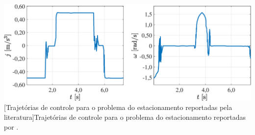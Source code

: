 \noindent	
\begin{minipage}{\textwidth}
	\vspace{\onelineskip}
	\centering
	\includegraphics[scale=0.42]{fig/resultados/estacionamento/obs/original}
	[Trajetórias de controle para o problema do estacionamento reportadas pela literatura]{Trajetórias de controle para o problema do estacionamento reportadas por .}
	\label{fig:estacionamento:original}
	\vspace{\onelineskip}
\end{minipage}


